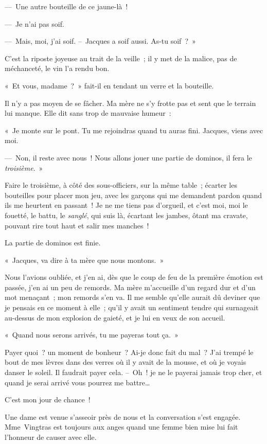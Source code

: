 \documentclass[french,twoside]{book} %
\begin{document}
— Une autre bouteille de ce jaune-là !\par
— Je n’ai pas soif.\par
— Mais, moi, j’ai soif. – Jacques a soif aussi. As-tu soif ? »\par
C’est la riposte joyeuse au trait de la veille ; il y met de la malice, pas de méchanceté, le vin l’a rendu bon.\par
« Et vous, madame ? » fait-il en tendant un verre et la bouteille.\par
Il n’y a pas moyen de se fâcher. Ma mère ne s’y frotte pas et sent que le terrain lui manque. Elle dit sans trop de mauvaise humeur :\par
« Je monte sur le pont. Tu me rejoindras quand tu auras fini. Jacques, viens avec moi.\par
— Non, il reste avec nous ! Nous allons jouer une partie de dominos, il fera le \emph{troisième}. »\par
Faire le troisième, à côté des sous-officiers, sur la même table ; écarter les bouteilles pour placer mon jeu, avec les garçons qui me demandent pardon quand ils me heurtent en passant ! Je ne me tiens pas d’orgueil, et c’est moi, moi le fouetté, le battu, le\emph{ sanglé}, qui suis là, écartant les jambes, ôtant ma cravate, pouvant rire tout haut et salir mes manches !\par
\bigbreak
\noindent La partie de dominos est finie.\par
« Jacques, va dire à ta mère que nous montons. »\par
Nous l’avions oubliée, et j’en ai, dès que le coup de feu de la première émotion est passée, j’en ai un peu de remords. Ma mère m’accueille d’un regard dur et d’un mot menaçant ; mon remords s’en va. Il me semble qu’elle aurait dû deviner que je pensais en ce moment à elle ; qu’il y avait un sentiment tendre qui surnageait au-dessus de mon explosion de gaieté, et je lui en veux de son accueil.\par
« Quand nous serons arrivés, tu me payeras tout ça. »\par
Payer quoi ? un moment de bonheur ? Ai-je donc fait du mal ? J’ai trempé le bout de mes lèvres dans des verres où il y avait de la mousse, et où je voyais danser le soleil. Il faudrait payer cela. – Oh ! je ne le payerai jamais trop cher, et quand je serai arrivé vous pourrez me battre…\par
\bigbreak
\noindent C’est mon jour de chance !\par
Une dame est venue s’asseoir près de nous et la conversation s’est engagée. Mme Vingtras est toujours aux anges quand une femme bien mise lui fait l’honneur de causer avec elle.\par
\end{document}
